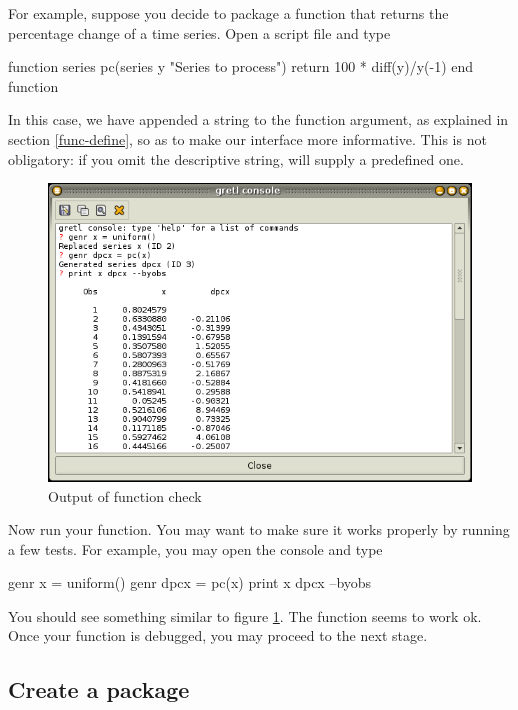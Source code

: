 For example, suppose you decide to package a function that returns the
percentage change of a time series. Open a script file and type
\begin{code}
function series pc(series y "Series to process")
  return 100 * diff(y)/y(-1)
end function
\end{code}
In this case, we have appended a string to the function argument, as
explained in section \ref{func-define}, so as to make our interface
more informative.  This is not obligatory: if you omit the descriptive
string,  will supply a predefined one.

\begin{figure}[htbp]
  \centering
  \includegraphics[scale=0.5]{figures/func_check}
  \caption{Output of function check}
  \label{fig:func_check}
\end{figure}

Now run your function. You may want to make sure it works properly by
running a few tests. For example, you may open the console and type

\begin{code}
genr x = uniform()
genr dpcx = pc(x)
print x dpcx --byobs
\end{code}

You should see something similar to figure \ref{fig:func_check}. The
function seems to work ok.  Once your function is debugged, you
may proceed to the next stage.

\subsection{Create a package}

